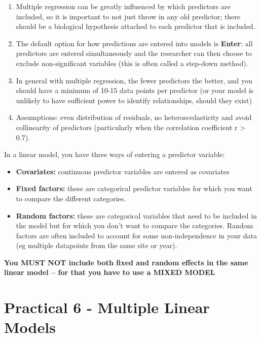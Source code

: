 \documentclass[
]{book}
\providecommand{\tightlist}{%
  \setlength{\itemsep}{0pt}\setlength{\parskip}{0pt}}
\begin{document}
\begin{enumerate}
\def\labelenumi{\arabic{enumi})}
\tightlist
\item
  Multiple regression can be greatly influenced by which predictors are included, so it is important to not just throw in any old predictor; there should be a biological hypothesis attached to each predictor that is included.
\item
  The default option for how predictions are entered into models is \textbf{Enter}: all predictors are entered simultaneously and the researcher can then choose to exclude non-significant variables (this is often called a step-down method).
\item
  In general with multiple regression, the fewer predictors the better, and you should have a minimum of 10-15 data points per predictor (or your model is unlikely to have sufficient power to identify relationships, should they exist)
\item
  Assumptions: even distribution of residuals, no heteroscedasticity and avoid collinearity of predictors (particularly when the correlation coefficient r \textgreater{} 0.7).
\end{enumerate}

In a linear model, you have three ways of entering a predictor variable:

\begin{itemize}
\tightlist
\item
  \textbf{Covariates:} continuous predictor variables are entered as covariates
\item
  \textbf{Fixed factors:} these are categorical predictor variables for which you want to compare the different categories.
\item
  \textbf{Random factors:} these are categorical variables that need to be included in the model but for which you don't want to compare the categories. Random factors are often included to account for some non-independence in your data (eg multiple datapoints from the same site or year).
\end{itemize}

\textbf{You MUST NOT include both fixed and random effects in the same linear model -- for that you have to use a MIXED MODEL}

\hypertarget{practical-6---multiple-linear-models}{%
\section{Practical 6 - Multiple Linear Models}\label{practical-6---multiple-linear-models}}
\end{document}
